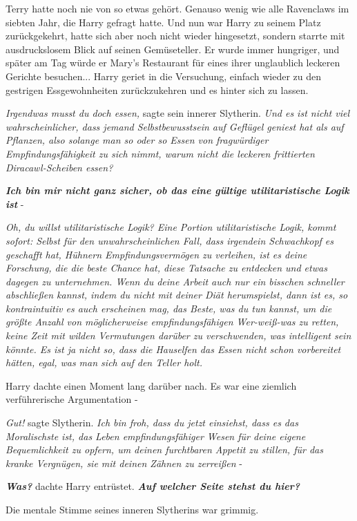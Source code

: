 Terry hatte noch nie von so etwas gehört. Genauso wenig wie alle Ravenclaws im
siebten Jahr, die Harry gefragt hatte. Und nun war Harry zu seinem Platz
zurückgekehrt, hatte sich aber noch nicht wieder hingesetzt, sondern starrte mit
ausdruckslosem Blick auf seinen Gemüseteller. Er wurde immer hungriger, und
später am Tag würde er Mary's Restaurant für eines ihrer unglaublich leckeren
Gerichte besuchen... Harry geriet in die Versuchung, einfach wieder zu den
gestrigen Essgewohnheiten zurückzukehren und es hinter sich zu lassen.

\emph{Irgendwas musst du doch essen, }sagte sein innerer Slytherin.
\emph{Und es ist nicht viel wahrscheinlicher, dass jemand Selbstbewusstsein auf
Geflügel geniest hat als auf Pflanzen, also solange man so oder so Essen von
fragwürdiger Empfindungsfähigkeit zu sich nimmt, warum nicht die leckeren
frittierten Diracawl-Scheiben essen?}

\textbf{\emph{Ich bin mir nicht ganz sicher, ob das eine gültige
utilitaristische Logik ist}} -

\emph{Oh, du willst utilitaristische Logik? Eine Portion utilitaristische
Logik, kommt sofort: Selbst für den unwahrscheinlichen Fall, dass irgendein
Schwachkopf es geschafft hat, Hühnern Empfindungsvermögen zu verleihen, ist es
deine Forschung, die die beste Chance hat, diese Tatsache zu entdecken und
etwas dagegen zu unternehmen. Wenn du deine Arbeit auch nur ein bisschen
schneller abschließen kannst, indem du nicht mit deiner Diät herumspielst, dann
ist es, so kontraintuitiv es auch erscheinen mag, das Beste, was du tun kannst,
um die größte Anzahl von möglicherweise empfindungsfähigen Wer-weiß-was zu
retten, keine Zeit mit wilden Vermutungen darüber zu verschwenden, was
intelligent sein könnte. Es ist ja nicht so, dass die Hauselfen das Essen nicht
schon vorbereitet hätten, egal, was man sich auf den Teller holt.}

Harry dachte einen Moment lang darüber nach. Es war eine ziemlich verführerische
Argumentation -

\emph{Gut!} sagte Slytherin. \emph{Ich bin froh, dass du jetzt einsiehst, dass
es das Moralischste ist, das Leben empfindungsfähiger Wesen für deine eigene
Bequemlichkeit zu opfern, um deinen furchtbaren Appetit zu stillen, für das
kranke Vergnügen, sie mit deinen Zähnen zu zerreißen} -

\textbf{\emph{Was?}} dachte Harry entrüstet. \textbf{\emph{Auf welcher Seite
stehst du hier?}}

Die mentale Stimme seines inneren Slytherins war grimmig.

